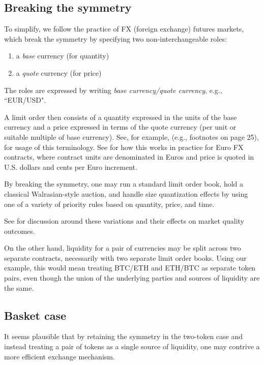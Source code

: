 \documentclass[11pt, reqno]{amsart}
\begin{document}
\subsection{Breaking the symmetry}
To simplify, we follow the practice of FX (foreign exchange) futures markets,
which break the symmetry by specifying two non-interchangeable roles:
\begin{enumerate}
	\item a \emph{base} currency (for quantity)
	\item a \emph{quote} currency (for price)
\end{enumerate}
The roles are expressed by writing \emph{base currency/quote currency}, e.g.,
``EUR/USD".

A limit order then consists of a quantity expressed in the units of the base
currency and a price expressed in terms of the quote currency (per unit or
suitable multiple of base currency). See, for example, \cite{Cme23} (e.g.,
footnotes on page 25), for usage of this terminology. See \cite{CmeFx} for how
this works in practice for Euro FX contracts, where contract units are
denominated in Euros and price is quoted in U.S. dollars and cents per Euro
increment.

By breaking the symmetry, one may run a standard limit order book, hold a
classical Walrasian-style auction, and handle size quantization effects by
using one of a variety of priority rules based on quantity, price, and time.

See \cite{BeLaLiVa22} for discussion around these variations and their effects
on market quality outcomes.

On the other hand, liquidity for a pair of currencies may be split across two
separate contracts, necessarily with two separate limit order books. Using our
example, this would mean treating BTC/ETH and ETH/BTC as separate token pairs,
even though the union of the underlying parties and sources of liquidity are
the same.

\subsection{Basket case}
It seems plausible that by retaining the symmetry in the two-token case and
instead treating a pair of tokens as a single source of liquidity, one may
contrive a more efficient exchange mechanism.
\end{document}
